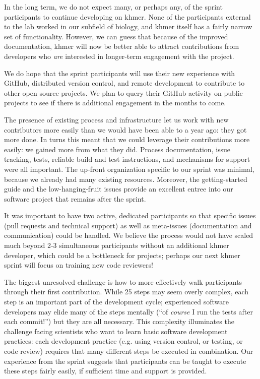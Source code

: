 \documentclass[11pt]{article}
\begin{document}
In the long term, we do not expect many, or perhaps any, of the sprint
participants to continue developing on khmer.  None of the
participants external to the lab worked in our subfield of biology,
and khmer itself has a fairly narrow set of functionality.  However,
we can guess that because of the improved documentation, khmer will
now be better able to attract contributions from developers who {\em
  are} interested in longer-term engagement with the project.

We do hope that the sprint participants will use their new experience
with GitHub, distributed version control, and remote development to
contribute to other open source projects.  We plan to query their
GitHub activity on public projects to see if there is additional
engagement in the months to come.

The presence of existing process and infrastructure let us work with
new contributors more easily than we would have been able to a year
ago: they got more done.  In turns this meant that we could leverage
their contributions more easily: we gained more from what they did.
Process documentation, issue tracking, tests, reliable build and test
instructions, and mechanisms for support were all important.  The
up-front organization specific to our sprint was minimal, because we
already had many existing resources.  Moreover, the getting-started
guide and the low-hanging-fruit issues provide an excellent entree
into our software project that remains after the sprint.

It was important to have two active, dedicated participants so that
specific issues (pull requests and technical support) as well as
meta-issues (documentation and communication) could be handled.  We
believe the process would not have scaled much beyond 2-3 simultaneous
participants without an additional khmer developer, which could be a
bottleneck for projects; perhaps our next khmer sprint will focus on
training new code reviewers!

The biggest unresolved challenge is how to more effectively walk
participants through their first contribution.  While 25 steps may
seem overly complex, each step is an important part of the development
cycle; experienced software developers may elide many of the steps
mentally (``of {\em course} I run the tests after each commit!'') but
they are all necessary.  This complexity illuminates the challenge
facing scientists who want to learn basic software development
practices: each development practice (e.g. using version control, or
testing, or code review) requires that many different steps be
executed in combination.  Our experience from the sprint suggests that
participants can be taught to execute these steps fairly easily, if
sufficient time and support is provided.
\end{document}
